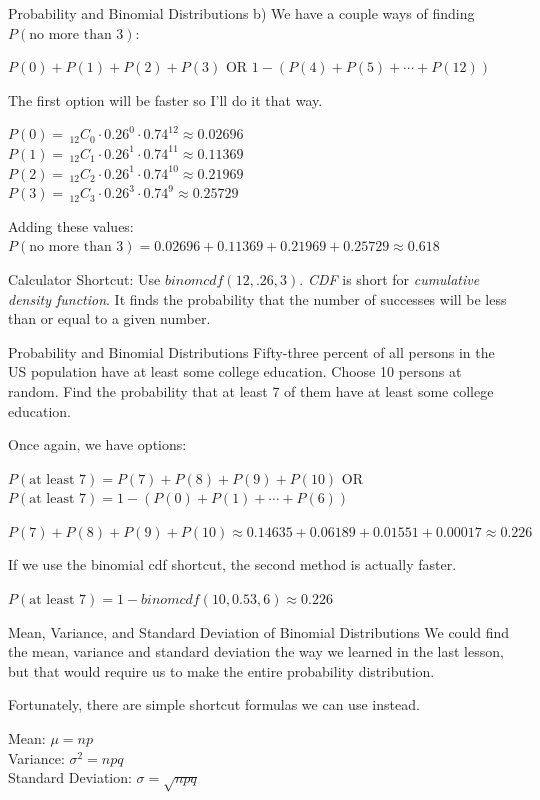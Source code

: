 \documentclass[t, aspectratio=169]{beamer}
\newcommand{\fp}[1]{\left({#1}\right)} %
\newcommand{\?}{\stackrel{?}{=}}
\newcommand{\nCr}[2]{\,_{#1}C_{#2}} %
\begin{document}
	\begin{frame}{Probability and Binomial Distributions}
		b) We have a couple ways of finding $P(\text{no more than 3})$: \pause
		
		$P(0) + P(1) + P(2) + P(3)$ \pause OR $1 - (P(4) + P(5) + \cdots + P(12))$ \pause
		
		The first option will be faster so I'll do it that way.
		
		$P(0) = \nCr{12}{0} \cdot 0.26^0 \cdot 0.74^{12} \approx 0.02696$ \\ \pause
		$P(1) = \nCr{12}{1} \cdot 0.26^1 \cdot 0.74^{11} \approx 0.11369$ \\ \pause
		$P(2) = \nCr{12}{2} \cdot 0.26^1 \cdot 0.74^{10} \approx 0.21969$ \\ \pause
		$P(3) = \nCr{12}{3} \cdot 0.26^3 \cdot 0.74^{9} \approx 0.25729$ \\ \pause
		
		Adding these values: $P(\text{no more than 3}) = 0.02696 + 0.11369 + 0.21969 + 0.25729 \approx 0.618$ \pause
		
		Calculator Shortcut: Use $binomcdf(12,.26,3)$. \pause
		\textit{CDF} is short for \textit{cumulative density function}. It finds the probability that the number of successes will be less than or equal to a given number.
	\end{frame}

	\begin{frame}{Probability and Binomial Distributions}
		Fifty-three percent of all persons in the US population have at least some college education. Choose 10 persons at random. Find the probability that at least 7 of them have at least some college education.
		
		Once again, we have options:
		
		$P(\text{at least 7}) = P(7) + P(8) + P(9) + P(10)$ \pause OR \\
		$P(\text{at least 7}) = 1 - \fp{P(0) + P(1) + \cdots + P(6)}$ \pause
		
		$P(7) + P(8) + P(9) + P(10) \approx 0.14635 + 0.06189 + 0.01551 + 0.00017 \approx 0.226$ \pause
		
		If we use the binomial cdf shortcut, the second method is actually faster. \pause
		
		$P(\text{at least 7}) = 1 - binomcdf(10, 0.53, 6) \approx 0.226$	
	\end{frame}

	\begin{frame}{Mean, Variance, and Standard Deviation of Binomial Distributions}
		We could find the mean, variance and standard deviation the way we learned in the last lesson, but that would require us to make the entire probability distribution. \pause
		
		Fortunately, there are simple shortcut formulas we can use instead. \pause
		
		Mean: $\mu = np$ \\
		Variance: $\sigma^2 = npq$ \\
		Standard Deviation: $\sigma = \sqrt{npq}$
	\end{frame}
\end{document}
